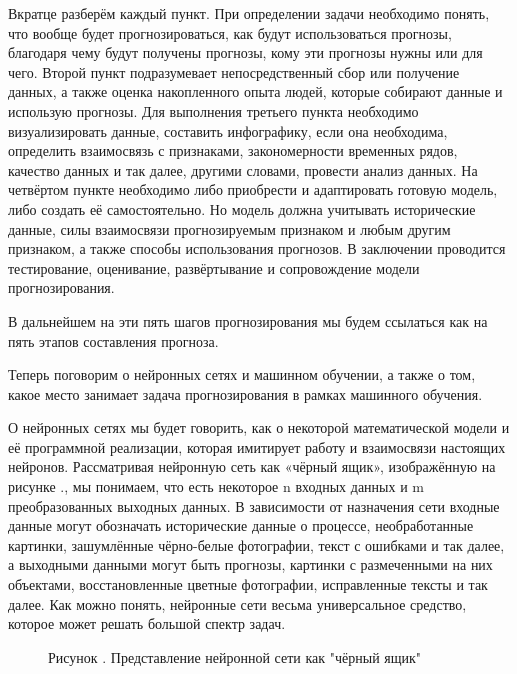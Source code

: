 {	\par \redline Вкратце разберём каждый пункт. При определении задачи необходимо понять, что вообще будет прогнозироваться, как будут использоваться прогнозы, благодаря чему будут получены прогнозы, кому эти прогнозы нужны или для чего. Второй пункт подразумевает непосредственный сбор или получение данных, а также оценка накопленного опыта людей, которые собирают данные и использую прогнозы. Для выполнения третьего пункта необходимо визуализировать данные, составить инфографику, если она необходима, определить взаимосвязь с признаками, закономерности временных рядов, качество данных и так далее, другими словами, провести анализ данных. На четвёртом пункте необходимо либо приобрести и адаптировать готовую модель, либо создать её самостоятельно. Но модель должна учитывать исторические данные, силы взаимосвязи прогнозируемым признаком и любым другим признаком, а также способы использования прогнозов. В заключении проводится тестирование, оценивание, развёртывание и сопровождение модели прогнозирования. 
	
	\par \redline В дальнейшем на эти пять шагов прогнозирования мы будем ссылаться как на пять этапов составления прогноза.
	
	\par \redline Теперь поговорим о нейронных сетях и машинном обучении, а также о том, какое место занимает задача прогнозирования в рамках машинного обучения. 
	
	\par \redline О нейронных сетях мы будет говорить, как о некоторой математической модели и её программной реализации, которая имитирует работу и взаимосвязи настоящих нейронов.  Рассматривая нейронную сеть как «чёрный ящик», изображённую на рисунке \thechaptercntr .\theimagecntr \spc, мы понимаем, что есть некоторое n входных данных и m преобразованных выходных данных. В зависимости от назначения сети входные данные могут обозначать исторические данные о процессе, необработанные картинки, зашумлённые чёрно-белые фотографии, текст с ошибками и так далее, а выходными данными могут быть прогнозы, картинки с размеченными на них объектами, восстановленные цветные фотографии, исправленные тексты и так далее. Как можно понять, нейронные сети весьма универсальное средство, которое может решать большой спектр задач. 
	
	\begin{figure}
		\centering
		\def\svgwidth{\textwidth}
		
		\caption*{\gostFont Рисунок \thechaptercntr .\theimagecntr \spc {--} Представление нейронной сети как "чёрный ящик"}
		\label{fig:NNBlackBox}
	\end{figure} \addtocounter{imagecntr}{1}
	
}
